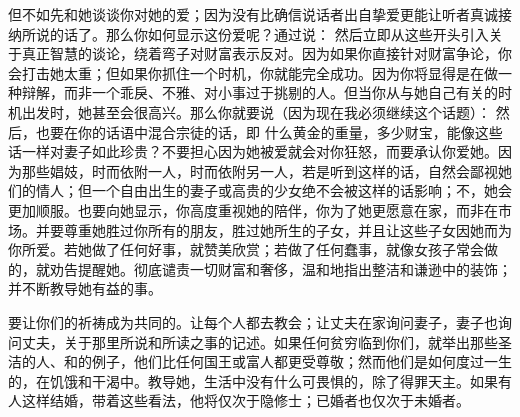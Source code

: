 但不如先和她谈谈你对她的爱；因为没有比确信说话者出自挚爱更能让听者真诚接纳所说的话了。那么你如何显示这份爱呢？通过说： 然后立即从这些开头引入关于真正智慧的谈论，绕着弯子对财富表示反对。因为如果你直接针对财富争论，你会打击她太重；但如果你抓住一个时机，你就能完全成功。因为你将显得是在做一种辩解，而非一个乖戾、不雅、对小事过于挑剔的人。但当你从与她自己有关的时机出发时，她甚至会很高兴。那么你就要说（因为现在我必须继续这个话题）： 然后，也要在你的话语中混合宗徒的话，即 什么黄金的重量，多少财宝，能像这些话一样对妻子如此珍贵？不要担心因为她被爱就会对你狂怒，而要承认你爱她。因为那些娼妓，时而依附一人，时而依附另一人，若是听到这样的话，自然会鄙视她们的情人；但一个自由出生的妻子或高贵的少女绝不会被这样的话影响；不，她会更加顺服。也要向她显示，你高度重视她的陪伴，你为了她更愿意在家，而非在市场。并要尊重她胜过你所有的朋友，胜过她所生的子女，并且让这些子女因她而为你所爱。若她做了任何好事，就赞美欣赏；若做了任何蠢事，就像女孩子常会做的，就劝告提醒她。彻底谴责一切财富和奢侈，温和地指出整洁和谦逊中的装饰；并不断教导她有益的事。\par

要让你们的祈祷成为共同的。让每个人都去教会；让丈夫在家询问妻子，妻子也询问丈夫，关于那里所说和所读之事的记述。如果任何贫穷临到你们，就举出那些圣洁的人、和的例子，他们比任何国王或富人都更受尊敬；然而他们是如何度过一生的，在饥饿和干渴中。教导她，生活中没有什么可畏惧的，除了得罪天主。如果有人这样结婚，带着这些看法，他将仅次于隐修士；已婚者也仅次于未婚者。\par


